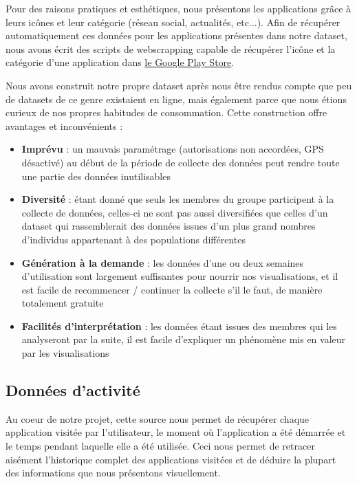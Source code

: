 \documentclass[a4paper, 11pt]{article}
\begin{document}
        Pour des raisons pratiques et esthétiques, nous présentons les applications grâce à leurs icônes et leur catégorie (réseau social, actualités, etc...). Afin de récupérer automatiquement ces données pour les applications présentes dans notre dataset, nous avons écrit des scripts de webscrapping capable de récupérer l'icône et la catégorie d'une application dans \href{https://play.google.com/store/apps?hl=fr}{le Google Play Store}.

        Nous avons construit notre propre dataset après nous être rendus compte que peu de datasets de ce genre existaient en ligne, mais également parce que nous étions curieux de nos propres habitudes de consommation. Cette construction offre avantages et inconvénients :
        \begin{itemize}
            \item \textbf{\color{red} Imprévu} : un mauvais paramétrage (autorisations non accordées, GPS désactivé) au début de la période de collecte des données peut rendre toute une partie des données inutilisables
            \item \textbf{\color{red} Diversité} : étant donné que seuls les membres du groupe participent à la collecte de données, celles-ci ne sont pas aussi diversifiées que celles d'un dataset qui rassemblerait des données issues d'un plus grand nombres d'individus appartenant à des populations différentes
            \item \textbf{\color{green} Génération à la demande} : les données d'une ou deux semaines d'utilisation sont largement suffisantes pour nourrir nos visualisations, et il est facile de recommencer / continuer la collecte s'il le faut, de manière totalement gratuite
            \item \textbf{\color{green} Facilités d'interprétation} : les données étant issues des membres qui les analyseront par la suite, il est facile d'expliquer un phénomène mis en valeur par les visualisations
        \end{itemize}

        \subsection{Données d'activité}
        Au coeur de notre projet, cette source nous permet de récupérer chaque application visitée par l'utilisateur, le moment où l'application a été démarrée et le temps pendant laquelle elle a été utilisée. Ceci nous permet de retracer aisément l'historique complet des applications visitées et de déduire la plupart des informations que nous présentons visuellement.
\end{document}

